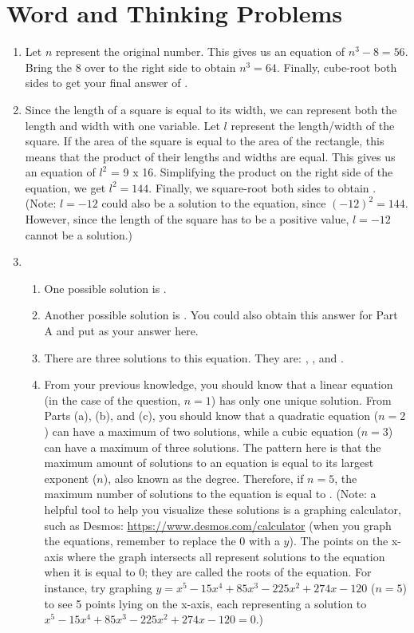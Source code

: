 \documentclass{article}
\begin{document}
\section{Word and Thinking Problems}
\begin{enumerate}
    \itemsep1.5em
    
    \item {Let $n$ represent the original number. This gives us an equation of $n^3 - 8 = 56$. Bring the 8 over to the right side to obtain $n^3 = 64$. Finally, cube-root both sides to get your final answer of .}
    
    \item {Since the length of a square is equal to its width, we can represent both the length and width with one variable. Let $l$ represent the length/width of the square. If the area of the square is equal to the area of the rectangle, this means that the product of their lengths and widths are equal. This gives us an equation of $l^2$ = 9 x 16. Simplifying the product on the right side of the equation, we get $l^2 = 144$. Finally, we square-root both sides to obtain . (Note: $l = -12$ could also be a solution to the equation, since $(-12)^2 = 144$. However, since the length of the square has to be a positive value, $l = -12$ cannot be a solution.)}
    
    \item
    \begin{enumerate}
        \itemsep2.0em
        \item {One possible solution is .}
        
        \item {Another possible solution is . You could also obtain this answer for Part A and put  as your answer here.}
        
        \item {There are three solutions to this equation. They are: , , and .}
        
        \item {From your previous knowledge, you should know that a linear equation (in the case of the question, $n = 1$) has only one unique solution. From Parts (a), (b), and (c), you should know that a quadratic equation ($n = 2$) can have a maximum of two solutions, while a cubic equation ($n = 3$) can have a maximum of three solutions. The pattern here is that the maximum amount of solutions to an equation is equal to its largest exponent ($n$), also known as the degree. Therefore, if $n = 5$, the maximum number of solutions to the equation is equal to . (Note: a helpful tool to help you visualize these solutions is a graphing calculator, such as Desmos: \url{https://www.desmos.com/calculator} (when you graph the equations, remember to replace the 0 with a $y$). The points on the x-axis where the graph intersects all represent solutions to the equation when it is equal to 0; they are called the roots of the equation. For instance, try graphing $y = x^5 - 15x^4 + 85x^3 - 225x^2 + 274x - 120$ ($n = 5$) to see 5 points lying on the x-axis, each representing a solution to $x^5 - 15x^4 + 85x^3 - 225x^2 + 274x - 120 = 0$.)}
        

\end{enumerate}
\end{enumerate}
\end{document}
